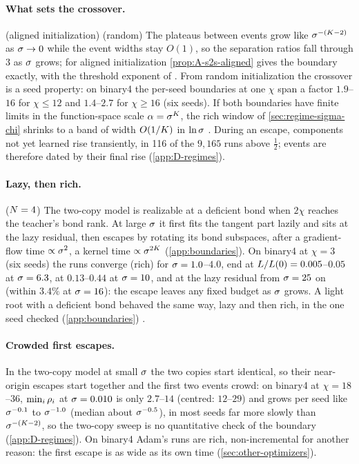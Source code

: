\paragraph{What sets the crossover.}
\derived{} (aligned initialization) \empirical{} (random) The plateaus between events grow like
$\sigma^{-(K-2)}$ as $\sigma\to0$ while the event widths stay $O(1)$, so the separation ratios fall through $3$ as
$\sigma$ grows; for aligned initialization \cref{prop:A-s2s-aligned} gives the boundary exactly, with the threshold
exponent of \citet{gissin2020implicit} \knownresult. From random initialization the crossover is a seed property:
on binary4 the per-seed boundaries at one $\chi$ span a factor $1.9$--$16$ for $\chi\le12$ and $1.4$--$2.7$ for
$\chi\ge16$ (six seeds). If both boundaries have finite limits in the function-space scale $\alpha=\sigma^K$, the
rich window of \cref{sec:regime-sigma-chi} shrinks to a band of width $O(1/K)$ in $\ln\sigma$ \conjecture. During
an escape, components not yet learned rise transiently, in 116 of the $9{,}165$ runs above $\frac12$; events are
therefore dated by their final rise (\cref{app:D-regimes}).

\paragraph{Lazy, then rich.}
\derived{} ($N=4$) \empirical{}  The two-copy model is realizable at
a deficient bond when $2\chi$ reaches the teacher's bond rank. At large $\sigma$ it first fits the tangent part lazily
and sits at the lazy residual, then escapes by rotating its bond subspaces, after a gradient-flow time
$\propto\sigma^2$, a kernel time $\propto\sigma^{2K}$ (\cref{app:boundaries}). On binary4 at $\chi=3$ (six seeds) the
runs converge (rich) for $\sigma=1.0$--$4.0$, end at $L/L(0)=0.005$--$0.05$ at $\sigma=6.3$, at $0.13$--$0.44$ at
$\sigma=10$, and at the lazy residual from $\sigma=25$ on (within $3.4\%$ at $\sigma=16$): the escape leaves any fixed
budget as $\sigma$ grows. A light root with a deficient bond behaved the same way, lazy and then rich, in the one
seed checked (\cref{app:boundaries}) \empirical.

\paragraph{Crowded first escapes.}
\empirical{} In the two-copy model at small $\sigma$ the two copies start identical, so their near-origin escapes
start together and the first two events crowd: on binary4 at $\chi=18$--$36$, $\min_i\rho_{i}$ at $\sigma=0.010$ is only
$2.7$--$14$ (centred: $12$--$29$) and grows per seed like $\sigma^{-0.1}$ to $\sigma^{-1.0}$ (median about
$\sigma^{-0.5}$), in most seeds far more slowly than $\sigma^{-(K-2)}$, so the two-copy sweep is no quantitative
check of the boundary (\cref{app:D-regimes}). On binary4 Adam's runs are rich, non-incremental for
another reason: the first escape is as wide as its own time (\cref{sec:other-optimizers}).

